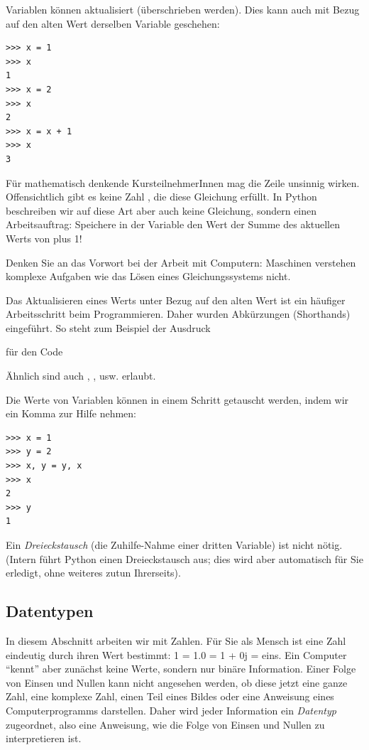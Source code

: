 Variablen können aktualisiert (\ie überschrieben werden). Dies kann auch mit Bezug auf den alten Wert derselben Variable geschehen:
\begin{cmdbox}
\begin{verbatim}
>>> x = 1
>>> x
1
>>> x = 2
>>> x
2
>>> x = x + 1
>>> x
3
\end{verbatim}
\end{cmdbox}

\begin{warnbox}
Für mathematisch denkende KursteilnehmerInnen mag die Zeile  unsinnig wirken. Offensichtlich gibt es keine Zahl , die diese Gleichung erfüllt. In Python beschreiben wir auf diese Art aber auch keine Gleichung, sondern einen Arbeitsauftrag: Speichere in der Variable  den Wert der Summe des aktuellen Werts von  plus 1!

Denken Sie an das Vorwort bei der Arbeit mit Computern: Maschinen verstehen komplexe Aufgaben wie das Lösen eines Gleichungssystems nicht.
\end{warnbox}

\begin{hintbox}[Shorthands]
Das Aktualisieren eines Werts unter Bezug auf den alten Wert ist ein häufiger Arbeitsschritt beim Programmieren. Daher wurden Abkürzungen (Shorthands) eingeführt. So steht zum Beispiel der Ausdruck
\begin{center}
\end{center}
für den Code
\begin{center}
\end{center}
Ähnlich sind auch , , usw. erlaubt.
\end{hintbox}

Die Werte von Variablen können in einem Schritt getauscht werden, indem wir ein Komma zur Hilfe nehmen:
\begin{cmdbox}
\begin{verbatim}
>>> x = 1
>>> y = 2
>>> x, y = y, x
>>> x
2
>>> y
1
\end{verbatim}
\end{cmdbox}
Ein \emph{Dreieckstausch} (\ie die Zuhilfe-Nahme einer dritten Variable) ist nicht nötig. (Intern führt Python einen Dreieckstausch aus; dies wird aber automatisch für Sie erledigt, ohne weiteres zutun Ihrerseits).


\subsection{Datentypen} \label{sub:datatypes}
In diesem Abschnitt arbeiten wir mit Zahlen. Für Sie als Mensch ist eine Zahl eindeutig durch ihren Wert bestimmt: 1 = 1.0 = 1 + 0j = eins. Ein Computer \enquote{kennt} aber zunächst keine Werte, sondern nur binäre Information. Einer Folge von Einsen und Nullen kann nicht angesehen werden, ob diese jetzt eine ganze Zahl, eine komplexe Zahl, einen Teil eines Bildes oder eine Anweisung eines Computerprogramms darstellen. Daher wird jeder Information ein \emph{Datentyp} zugeordnet, also eine Anweisung, wie die Folge von Einsen und Nullen zu interpretieren ist.

